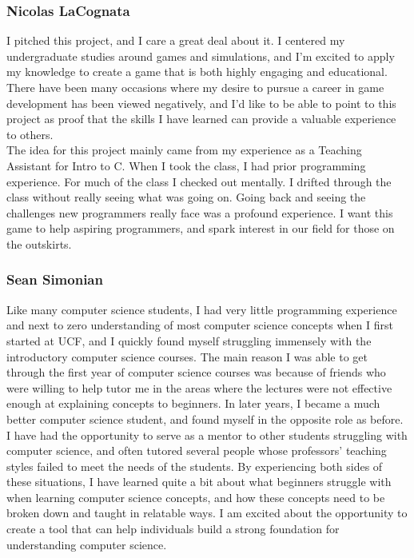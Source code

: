 \subsubsection{Nicolas LaCognata}
I pitched this project, and I care a great deal about it. I centered my
undergraduate studies around games and simulations, and I’m excited to apply my
knowledge to create a game that is both highly engaging and educational. There
have been many occasions where my desire to pursue a career in game development
has been viewed negatively, and I’d like to be able to point to this project as
proof that the skills I have learned can provide a valuable experience to
others.\\

The idea for this project mainly came from my experience as a Teaching Assistant for Intro to
C. When I took the class, I had prior programming experience. For much of the class I
checked out mentally. I drifted through the class without really seeing what was going on.
Going back and seeing the challenges new programmers really face was a profound
experience. I want this game to help aspiring programmers, and spark interest in
our field for those on the outskirts.

\subsubsection{Sean Simonian}
Like many computer science students, I had very little programming experience
and next to zero understanding of most computer science concepts when I first
started at UCF, and I quickly found myself struggling immensely with the
introductory computer science courses. The main reason I was able to get through
the first year of computer science courses was because of friends who were
willing to help tutor me in the areas where the lectures were not effective
enough at explaining concepts to beginners. In later years, I became a much
better computer science student, and found myself in the opposite role as
before. I have had the opportunity to serve as a mentor to other students
struggling with computer science, and often tutored several people whose
professors’ teaching styles failed to meet the needs of the students. By
experiencing both sides of these situations, I have learned quite a bit about
what beginners struggle with when learning computer science concepts, and how
these concepts need to be broken down and taught in relatable ways. I am excited
about the opportunity to create a tool that can help individuals build a strong
foundation for understanding computer science.\\

